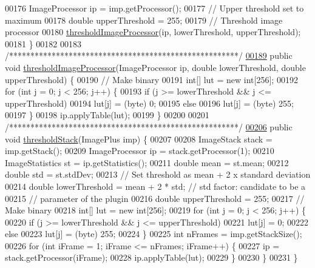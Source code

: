 \begin{DoxyCode}
00176     ImageProcessor ip = imp.getProcessor();
00177     \textcolor{comment}{// Upper threshold set to maximum}
00178     \textcolor{keywordtype}{double} upperThreshold = 255;
00179     \textcolor{comment}{// Threshold image processor}
00180     \hyperlink{classfunctions_1_1_computer_vision_ae1ef4c4258127cb97bae706e7f65fc2e}{thresholdImageProcessor}(ip, lowerThreshold, upperThreshold);
00181   \}
00182 
00183   \textcolor{comment}{/******************************************************/}
\hypertarget{_computer_vision_8java_source_l00189}{}\hyperlink{classfunctions_1_1_computer_vision_ae1ef4c4258127cb97bae706e7f65fc2e}{00189}   \textcolor{keyword}{public} \textcolor{keywordtype}{void} \hyperlink{classfunctions_1_1_computer_vision_ae1ef4c4258127cb97bae706e7f65fc2e}{thresholdImageProcessor}(ImageProcessor ip, \textcolor{keywordtype}{double} lowerThreshold, \textcolor{keywordtype}{
      double} upperThreshold) \{
00190     \textcolor{comment}{// Make binary}
00191     \textcolor{keywordtype}{int}[] lut = \textcolor{keyword}{new} \textcolor{keywordtype}{int}[256];
00192     \textcolor{keywordflow}{for} (\textcolor{keywordtype}{int} j = 0; j < 256; j++) \{
00193       \textcolor{keywordflow}{if} (j >= lowerThreshold && j <= upperThreshold)
00194         lut[j] = (byte) 0;
00195       \textcolor{keywordflow}{else}
00196         lut[j] = (byte) 255;
00197     \}
00198     ip.applyTable(lut);
00199   \}
00200 
00201   \textcolor{comment}{/******************************************************/}
\hypertarget{_computer_vision_8java_source_l00206}{}\hyperlink{classfunctions_1_1_computer_vision_a253912ee71e289051b50b08dcce6376f}{00206}   \textcolor{keyword}{public} \textcolor{keywordtype}{void} \hyperlink{classfunctions_1_1_computer_vision_a253912ee71e289051b50b08dcce6376f}{thresholdStack}(ImagePlus imp) \{
00207 
00208     ImageStack stack = imp.getStack();
00209     ImageProcessor ip = stack.getProcessor(1);
00210     ImageStatistics st = ip.getStatistics();
00211     \textcolor{keywordtype}{double} mean = st.mean;
00212     \textcolor{keywordtype}{double} std = st.stdDev;
00213     \textcolor{comment}{// Set threshold as mean + 2 x standard deviation}
00214     \textcolor{keywordtype}{double} lowerThreshold = mean + 2 * std; \textcolor{comment}{// std factor: candidate to be a}
00215                                             \textcolor{comment}{// parameter of the plugin}
00216     \textcolor{keywordtype}{double} upperThreshold = 255;
00217     \textcolor{comment}{// Make binary}
00218     \textcolor{keywordtype}{int}[] lut = \textcolor{keyword}{new} \textcolor{keywordtype}{int}[256];
00219     \textcolor{keywordflow}{for} (\textcolor{keywordtype}{int} j = 0; j < 256; j++) \{
00220       \textcolor{keywordflow}{if} (j >= lowerThreshold && j <= upperThreshold)
00221         lut[j] = 0;
00222       \textcolor{keywordflow}{else}
00223         lut[j] = (byte) 255;
00224     \}
00225     \textcolor{keywordtype}{int} nFrames = imp.getStackSize();
00226     \textcolor{keywordflow}{for} (\textcolor{keywordtype}{int} iFrame = 1; iFrame <= nFrames; iFrame++) \{
00227       ip = stack.getProcessor(iFrame);
00228       ip.applyTable(lut);
00229     \}
00230   \}
00231 \}
\end{DoxyCode}
